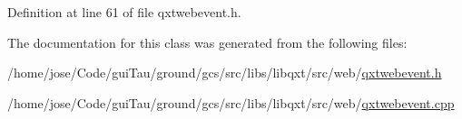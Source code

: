 Definition at line 61 of file qxtwebevent.\-h.



The documentation for this class was generated from the following files\-:\begin{DoxyCompactItemize}
\item 
/home/jose/\-Code/gui\-Tau/ground/gcs/src/libs/libqxt/src/web/\hyperlink{qxtwebevent_8h}{qxtwebevent.\-h}\item 
/home/jose/\-Code/gui\-Tau/ground/gcs/src/libs/libqxt/src/web/\hyperlink{qxtwebevent_8cpp}{qxtwebevent.\-cpp}\end{DoxyCompactItemize}
